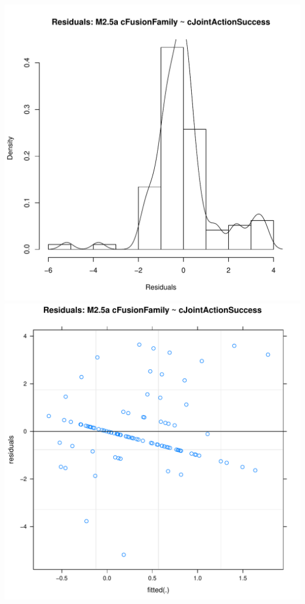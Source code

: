 \documentclass[12pt]{report}
\begin{document}
\newpage
\centering
\includegraphics[scale =.4]{../images/MLM25aHist.pdf}
\includegraphics[scale =.4]{../images/MLM25aScatter.pdf}
\end{document}
